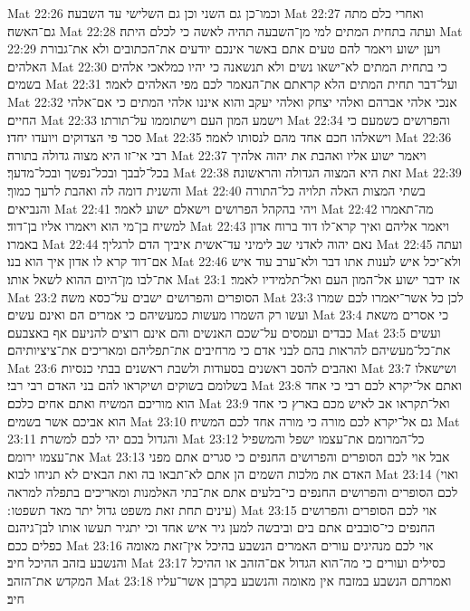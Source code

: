 Mat 22:26  וכמו־כן גם השני וכן גם השלישי עד השבעה׃
Mat 22:27  ואחרי כלם מתה גם־האשה׃
Mat 22:28  ועתה בתחית המתים למי מן־השבעה תהיה לאשה כי לכלם היתה׃
Mat 22:29  ויען ישוע ויאמר להם טעים אתם באשר אינכם יודעים את־הכתובים ולא את־גבורת האלהים׃
Mat 22:30  כי בתחית המתים לא־ישאו נשים ולא תנשאנה כי יהיו כמלאכי אלהים בשמים׃
Mat 22:31  ועל־דבר תחית המתים הלא קראתם את־הנאמר לכם מפי האלהים לאמר׃
Mat 22:32  אנכי אלהי אברהם ואלהי יצחק ואלהי יעקב והוא איננו אלהי המתים כי אם־אלהי החיים׃
Mat 22:33  וישמע המון העם וישתוממו על־תורתו׃
Mat 22:34  והפרושים כשמעם כי סכר פי הצדוקים ויועדו יחדו׃
Mat 22:35  וישאלהו חכם אחד מהם לנסותו לאמר׃
Mat 22:36  רבי אי־זו היא מצוה גדולה בתורה׃
Mat 22:37  ויאמר ישוע אליו ואהבת את יהוה אלהיך בכל־לבבך ובכל־נפשך ובכל־מדעך׃
Mat 22:38  זאת היא המצוה הגדולה והראשונה׃
Mat 22:39  והשנית דומה לה ואהבת לרעך כמוך׃
Mat 22:40  בשתי המצות האלה תלויה כל־התורה והנביאים׃
Mat 22:41  ויהי בהקהל הפרושים וישאלם ישוע לאמר׃
Mat 22:42  מה־תאמרו למשיח בן־מי הוא ויאמרו אליו בן־דוד׃
Mat 22:43  ויאמר אליהם ואיך קרא־לו דוד ברוח אדון באמרו׃
Mat 22:44  נאם יהוה לאדני שב לימיני עד־אשית איביך הדם לרגליך׃
Mat 22:45  ועתה אם־דוד קרא לו אדון איך הוא בנו׃
Mat 22:46  ולא־יכל איש לענות אתו דבר ולא־ערב עוד איש את־לבו מן־היום ההוא לשאל אותו׃
Mat 23:1  אז ידבר ישוע אל־המון העם ואל־תלמידיו לאמר׃
Mat 23:2  הסופרים והפרושים ישבים על־כסא משה׃
Mat 23:3  לכן כל אשר־יאמרו לכם שמרו ועשו רק השמרו מעשות כמעשיהם כי אמרים הם ואינם עשים׃
Mat 23:4  כי אסרים משאת כבדים ועמסים על־שכם האנשים והם אינם רוצים להניעם אף באצבעם׃
Mat 23:5  ועשים את־כל־מעשיהם להראות בהם לבני אדם כי מרחיבים את־תפליהם ומאריכים את־ציציותיהם׃
Mat 23:6  ואהבים להסב ראשנים בסעודות ולשבת ראשנים בבתי כנסיות׃
Mat 23:7  ושישאלו בשלומם בשוקים ושיקראו להם בני האדם רבי רבי׃
Mat 23:8  ואתם אל־יקרא לכם רבי כי אחד הוא מוריכם המשיח ואתם אחים כלכם׃
Mat 23:9  ואל־תקראו אב לאיש מכם בארץ כי אחד הוא אביכם אשר בשמים׃
Mat 23:10  גם אל־יקרא לכם מורה כי מורה אחד לכם המשיח׃
Mat 23:11  והגדול בכם יהי לכם למשרת׃
Mat 23:12  כל־המרומם את־עצמו ישפל והמשפיל את־עצמו ירומם׃
Mat 23:13  אבל אוי לכם הסופרים והפרושים החנפים כי סגרים אתם מפני האדם את מלכות השמים הן אתם לא־תבאו בה ואת הבאים לא תניחו לבוא׃
Mat 23:14  (ואוי לכם הסופרים והפרושים החנפים כי־בלעים אתם את־בתי האלמנות ומאריכים בתפלה למראה עינים תחת זאת משפט גדול יתר מאד תשפטו ׃)
Mat 23:15  אוי לכם הסופרים והפרושים החנפים כי־סובבים אתם בים וביבשה למען גיר איש אחד וכי יתגיר תעשו אותו לבן־גיהנם כפלים ככם׃
Mat 23:16  אוי לכם מנהיגים עורים האמרים הנשבע בהיכל אין־זאת מאומה והנשבע בזהב ההיכל חיב׃
Mat 23:17  כסילים ועורים כי מה־הוא הגדול אם־הזהב או ההיכל המקדש את־הזהב׃
Mat 23:18  ואמרתם הנשבע במזבח אין מאומה והנשבע בקרבן אשר־עליו חיב׃
